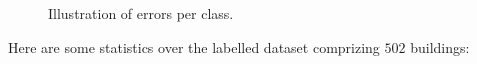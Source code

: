 \documentclass[a4paper, 11pt]{article}
\begin{document}
\begin{figure}
\begin{center}
{{\begin{subfloatrow}[4]
					\end{subfloatrow}
				}
				{
					\caption*{\label{fig::fac_samples} (iii). Samples of Facet errors.}
				}
			}
			{
				\caption{\label{fig::samples}Illustration of errors per class.}
			}
		\end{center}
	\end{figure}
	\clearpage


	Here are some statistics over the labelled dataset comprizing $502$ buildings:
\end{document}
